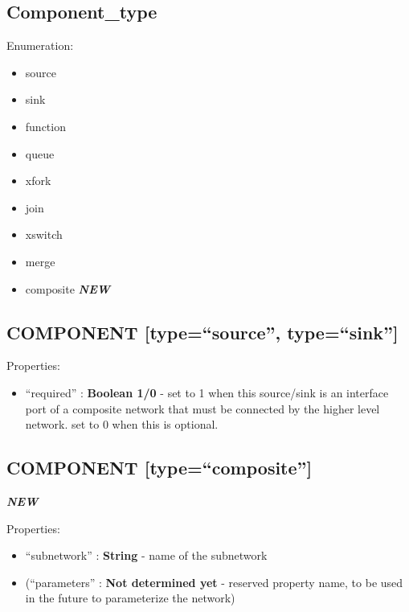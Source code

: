 \subsection{Component\_type}\label{componentux5ftype}

Enumeration:

\begin{itemize}
\itemsep1pt\parskip0pt
\item
  source
\item
  sink
\item
  function
\item
  queue
\item
  xfork
\item
  join
\item
  xswitch
\item
  merge
\item
  composite \textbf{\emph{NEW}}
\end{itemize}

\subsection{COMPONENT {[}type=``source'',
type=``sink''{]}}\label{component-typesource-typesink}

Properties:

\begin{itemize}
\itemsep1pt\parskip0pt
\item
  ``required'' : \textbf{Boolean 1/0} - set to 1 when this source/sink
  is an interface port of a composite network that must be connected by
  the higher level network. set to 0 when this is optional.
\end{itemize}

\subsection{COMPONENT
{[}type=``composite''{]}}\label{component-typecomposite}

\textbf{\emph{NEW}}

Properties:

\begin{itemize}
\itemsep1pt\parskip0pt
\item
  ``subnetwork'' : \textbf{String} - name of the subnetwork
\item
  (``parameters'' : \textbf{Not determined yet} - reserved property
  name, to be used in the future to parameterize the network)
\end{itemize}

